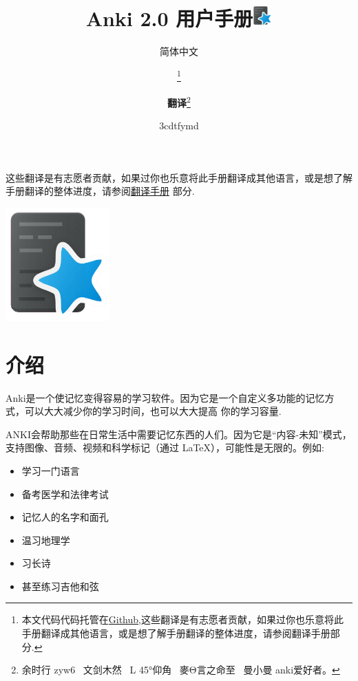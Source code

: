 \documentclass[a4paper]{book}
\title{Anki 2.0 用户手册\includegraphics[width=1em]{figures/CREATINGCUSTOM-NOTE-TYPESIN-ANKI1.png}}
\author{简体中文}
\title{\textbf{\savedtitle}}
\author{\textbf{\savedauthor}\thanks{本文代码代码托管在\href{https://github.com/xiaoleeza/Ankihelp}{Github},这些翻译是有志愿者贡献，如果过你也乐意将此手册翻译成其他语言，或是想了解手册翻译的整体进度，请参阅翻译手册部分.}\and \textbf{翻译}\thanks{\ttfamily 余时行
		zyw6~
		文剑木然~
		L
		45°\hspace{-.1ex}仰角~
		麥\hspace{-.07ex}Θ\hspace{-.07ex}言之命至~
		曼小曼
		anki\hspace{-.07ex}爱好者。}}
\date{\w3cdtfymd}
\makeatletter
\let\savedauthor=\@author
\let\savedtitle=\@title
\newcounter{tab}[chapter]
\makeatother
\begin{document}
	\frontmatter
	\maketitle
	\thispagestyle{empty}
	\setcounter{tocdepth}{4}
	\tableofcontents\newpage\thispagestyle{empty}
	
	\mainmatter
	\fancyhf{}
	\fancyhead[LE]{{\small\leftmark}}
	\fancyhead[RO]{{\small\rightmark}}
	\fancyhead[RE,LO]{{\small\savedauthor\hspace*{1ex}\textbf{\savedtitle}}}
	\fancyfoot[LE,RO]{\small\textbf\thepage}
	\pagestyle{fancy}
	
	
	这些翻译是有志愿者贡献，如果过你也乐意将此手册翻译成其他语言，或是想了解手册翻译的整体进度，请参阅\hyperref[translatingmanual]{翻译手册} 部分.
	\vfill
	\begin{center}
	\hfill\includegraphics[width=0.3\textwidth]{figures/CREATINGCUSTOM-NOTE-TYPESIN-ANKI1.png}
	\end{center}
	
	\chapter{介绍}
	
	Anki是一个使记忆变得容易的学习软件。因为它是一个自定义多功能的记忆方式，可以大大减少你的学习时间，也可以大大提高 你的学习容量.
	
	ANKI会帮助那些在日常生活中需要记忆东西的人们。因为它是“内容-未知”模式，支持图像、音频、视频和科学标记（通过 \LaTeX{}），可能性是无限的。例如:
	
	\begin{itemize}
		\itemsep1pt\parskip0pt
		\item 学习一门语言
		\item 备考医学和法律考试
		\item 记忆人的名字和面孔
		\item 温习地理学
		\item 习长诗
		\item 甚至练习吉他和弦
	\end{itemize}
	
\end{document}
